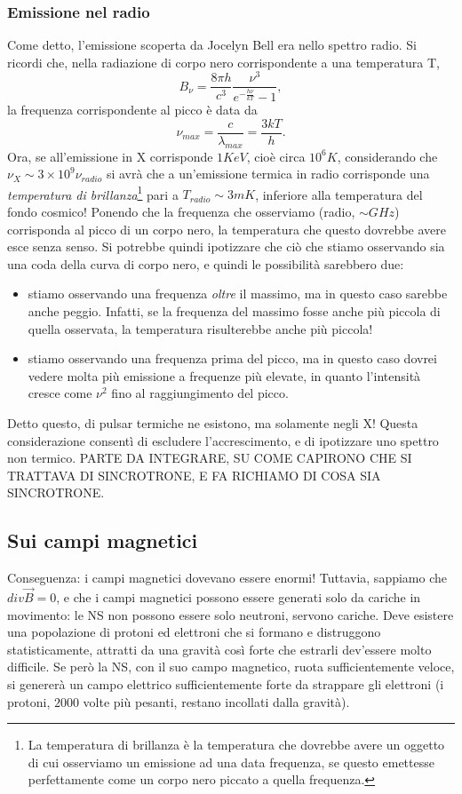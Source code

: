 \subsubsection{Emissione nel radio}
Come detto, l'emissione scoperta da Jocelyn Bell era nello spettro radio. 
Si ricordi che, nella radiazione di corpo nero corrispondente a una temperatura T,
\begin{equation}
    B_{\nu} = \frac{8\pi h}{c^3}\frac{\nu^3}{e^{-\frac{h\nu}{kT}} - 1},
\end{equation}
la frequenza corrispondente al picco è data da
\begin{equation}
    \nu_{max}= \frac{c}{\lambda_{max}}=\frac{3kT}{h}.
    \label{eq: picco Black Body}
\end{equation}
Ora, se all'emissione in X corrisponde $1KeV$, cioè circa $10^6K$, considerando che $\nu_X\sim 3\times10^9\nu_{radio} $ si avrà che a un'emissione termica in radio corrisponde una \textit{temperatura di brillanza}\footnote{La temperatura di brillanza è la temperatura che dovrebbe avere un oggetto di cui osserviamo un emissione ad una data frequenza, se questo emettesse perfettamente come un corpo nero piccato a quella frequenza.} pari a $T_{radio}\sim3mK$, inferiore alla temperatura del fondo cosmico!
Ponendo che la frequenza che osserviamo (radio, $\sim GHz$) corrisponda al picco di un corpo nero, la temperatura che questo dovrebbe avere esce senza senso. 
Si potrebbe quindi ipotizzare che ciò che stiamo osservando sia una coda della curva di corpo nero, e quindi le possibilità sarebbero due:
\begin{itemize}
    \item stiamo osservando una frequenza \textit{oltre} il massimo, ma in questo caso sarebbe anche peggio. Infatti, se la frequenza del massimo fosse anche più piccola di quella osservata, la temperatura risulterebbe anche più piccola!
    \item stiamo osservando una frequenza prima del picco, ma in questo caso dovrei vedere molta più emissione a frequenze più elevate, in quanto l'intensità cresce come $\nu^2$ fino al raggiungimento del picco.
\end{itemize}
Detto questo, di pulsar termiche ne esistono, ma solamente negli X!
Questa considerazione consentì di escludere l'accrescimento, e di ipotizzare uno spettro non termico.
PARTE DA INTEGRARE, SU COME CAPIRONO CHE SI TRATTAVA DI SINCROTRONE, E FA RICHIAMO DI COSA SIA SINCROTRONE.

\subsection{Sui campi magnetici}
Conseguenza: i campi magnetici dovevano essere enormi!
Tuttavia, sappiamo che $div\vec{B}=0$, e che i campi magnetici possono essere generati solo da cariche in movimento: 
le NS non possono essere solo neutroni, servono cariche.
Deve esistere una popolazione di protoni ed elettroni che si formano e distruggono statisticamente, attratti da una gravità così forte che estrarli dev'essere molto difficile.
Se però la NS, con il suo campo magnetico, ruota sufficientemente veloce, si genererà un campo elettrico sufficientemente forte da strappare gli elettroni (i protoni, $2000$ volte più pesanti, restano incollati dalla gravità).

